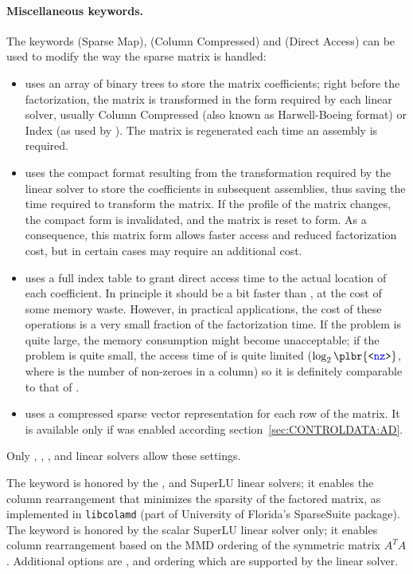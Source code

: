 \paragraph{Miscellaneous keywords.}
The keywords  (Sparse Map),  (Column Compressed)
and  (Direct Access) can be used to modify the way
the sparse matrix is handled:
\begin{itemize}
\item {} uses an array of binary trees to store the matrix
coefficients; right before the factorization, the matrix is transformed
in the form required by each linear solver, usually Column Compressed
(also known as Harwell-Boeing format) or Index (as used by ).
The matrix is regenerated each time an assembly is required.
\item {} uses the compact format resulting from the transformation
required by the linear solver to store the coefficients
in subsequent assemblies,
thus saving the time required to transform the matrix.
If the profile of the matrix changes, the compact form is invalidated,
and the matrix is reset to  form.  As a consequence, this matrix
form allows faster access and reduced factorization cost, but in certain
cases may require an additional cost.
\item {} uses a full index table to grant direct access time to
the actual location of each coefficient.
In principle it should be a bit faster than , at the cost
of some memory waste.
However, in practical applications, the cost of these operations
is a very small fraction of the factorization time.
If the problem is quite large, the memory consumption might
become unacceptable; if the problem is quite small, the access time
of  is quite limited ($\log_2\plbr{\bnt{nz}}$, where
 is the number of non-zeroes in a column) so it is definitely
comparable to that of .
\item {} uses a compressed sparse vector representation for each row of the matrix.
  It is available only if  was enabled according section~\ref{sec:CONTROLDATA:AD}.
\end{itemize}
Only , , ,  and 
linear solvers allow these settings.

The keyword  is honored by the ,  and SuperLU linear solvers;
it enables the column rearrangement that minimizes the sparsity
of the factored matrix, as implemented in \texttt{libcolamd}
(part of University of Florida's SparseSuite package).
The keyword  is honored by 
the scalar SuperLU linear solver only; it enables column rearrangement
based on the MMD ordering of the symmetric matrix $A^T A$.
Additional options are ,  and  ordering which are supported by the  linear solver.


